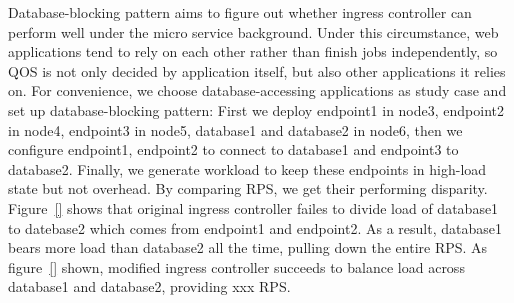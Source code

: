 Database-blocking pattern aims to figure out whether ingress controller can perform well under the micro service background. Under this circumstance, web applications tend to rely on each other rather than
finish jobs independently, so QOS is not only decided by application itself, but also other applications it relies on. For convenience, we choose database-accessing applications as study case and set up database-blocking
pattern: First we deploy endpoint1 in node3, endpoint2 in node4, endpoint3 in node5, database1 and database2 in node6, then we configure endpoint1, endpoint2 to connect to database1 and endpoint3 to database2.
Finally, we generate workload to keep these endpoints in high-load state but not overhead. By comparing RPS, we get their performing disparity. Figure~{\ref{}} shows that original ingress controller failes to divide load of database1 to datebase2
which comes from endpoint1 and endpoint2. As a result, database1 bears more load than database2 all the time, pulling down the entire RPS. As figure~{\ref{}} shown, modified ingress controller succeeds to balance load across database1 and database2,
providing xxx RPS.
